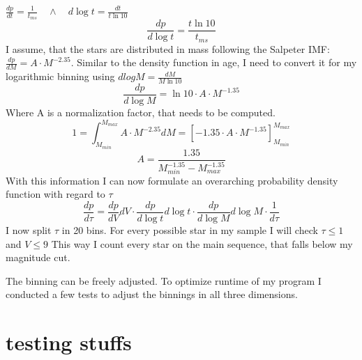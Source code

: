 \documentclass[a4paper,10pt]{article}
\begin{document}
  $\frac{dp}{dt}=\frac{1}{t_{ms}}\quad \land \quad d\log t=\frac{dt}{t \ln 10}$
 \begin{equation}
  \frac{dp}{d\log t}=\frac{t\ln 10}{t_{ms}}
 \end{equation}
 I assume, that the stars are distributed in mass following the Salpeter IMF:
 $\frac{dp}{dM}=A\cdot M^{-2.35}$\citep{1955ApJ...121..161S}. Similar
 to the density function in age, I need to convert it for my logarithmic binning using $dlogM = \frac{dM}{M\ln 10}$
 \begin{equation}
  \frac{dp}{d\log M}=\ln 10 \cdot A\cdot M^{-1.35}
 \end{equation}
 Where A is a normalization factor, that needs to be computed. 
 \begin{equation}
  1=\int_{M_{min}}^{M_{max}}A\cdot M^{-2.35} dM =\left[ -1.35\cdot A\cdot M^{-1.35}\right]_{M_{min}}^{M_{max}}
 \end{equation}
 \begin{equation}
  A= \frac{1.35}{M_{min}^{-1.35}-M_{max}^{-1.35}}
 \end{equation}
 With this information I can now formulate an overarching probability density function with regard to $\tau$
 \begin{equation}
  \frac{dp}{d\tau}=\frac{dp}{dV}dV \cdot \frac{dp}{d\log t}d\log t \cdot \frac{dp}{d\log M}d\log M\cdot \frac{1}{d\tau}
 \end{equation}
 I now split $\tau$ in 20 bins. For every possible star in my sample I will check $\tau\le 1$ and $V\le 9$ This way I count every
 star on the main sequence, that falls below my magnitude cut. 

 
 The binning can be freely adjusted. To optimize runtime of my program I conducted a few tests to adjust the binnings in all three dimensions.\\
 
 
 \section{testing stuffs}
 
\end{document}
